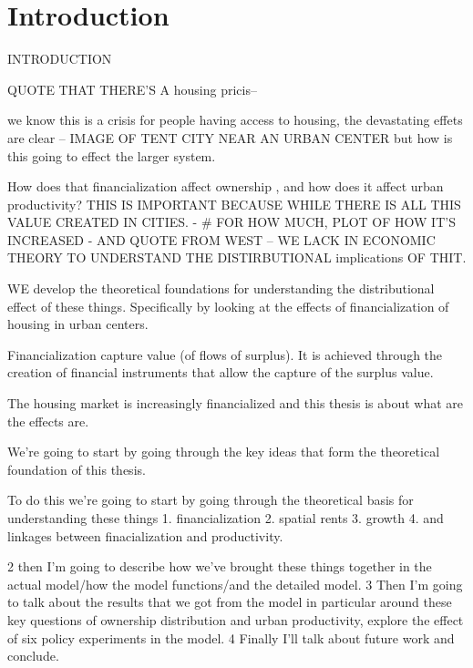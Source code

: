 \documentclass[]{article}
\begin{document}
 
\section{Introduction}



INTRODUCTION

QUOTE THAT THERE'S A housing pricis--

we know this is a crisis for people having access to housing, the devastating effets are clear -- IMAGE OF TENT CITY NEAR AN URBAN CENTER
but how is this going to effect the larger system.


How does that financialization affect ownership , and how does it affect urban productivity?
THIS IS IMPORTANT BECAUSE WHILE THERE IS ALL THIS VALUE CREATED IN CITIES. - # FOR HOW MUCH, PLOT OF HOW IT'S INCREASED - AND QUOTE FROM WEST -- WE LACK IN ECONOMIC THEORY TO UNDERSTAND THE DISTIRBUTIONAL implications OF THIT.


WE develop the theoretical foundations for understanding the distributional effect of these things. Specifically by looking at the effects of financialization of housing in urban centers. 

Financialization capture value (of flows of surplus). It is achieved through the creation of financial instruments that allow the capture of the surplus value. 

The housing market is increasingly financialized and this thesis is about what are the effects are. 

We’re going to start by going through the key ideas that form the theoretical foundation of this thesis.


To do this we’re going to start by going through the theoretical basis for understanding these things
1. financialization
2. spatial rents
3. growth
4. and linkages between finacialization and productivity.
 
 2 then I'm going to describe how we've brought these things together in the actual model/how the model functions/and the detailed model.
 3 Then I'm going to talk about the results that we got from the model in particular around these key questions of ownership distribution and urban productivity, explore the effect of six policy experiments in the model. 
 4 Finally I'll talk about future work and conclude.
\end{document}

